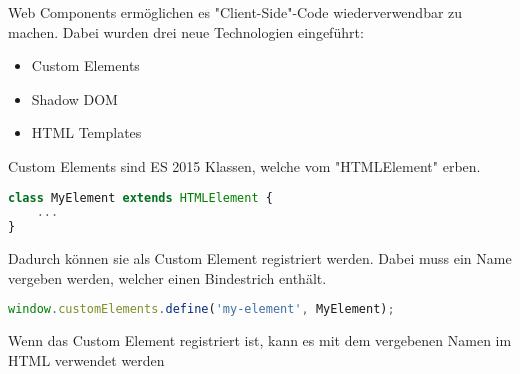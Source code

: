 

Web Components ermöglichen es "Client-Side"-Code wiederverwendbar zu machen. Dabei wurden drei neue Technologien eingeführt:

\begin{itemize}
    \item Custom Elements
    \item Shadow DOM
    \item HTML Templates
\end{itemize}

\cite{MDNWebComponents}


Custom Elements sind ES 2015 Klassen, welche vom "HTMLElement" erben. 

\begin{lstlisting}[language=TypeScript,caption={Erstellung einer Custom Element Klasse}]
class MyElement extends HTMLElement {
    ...
}
\end{lstlisting}

Dadurch können sie als Custom Element registriert werden. Dabei muss ein Name vergeben werden, welcher einen Bindestrich enthält.

\begin{lstlisting}[language=TypeScript,caption={Registrierung des Custom Elements}]
window.customElements.define('my-element', MyElement);
\end{lstlisting}

Wenn das Custom Element registriert ist, kann es mit dem vergebenen Namen im HTML verwendet werden



